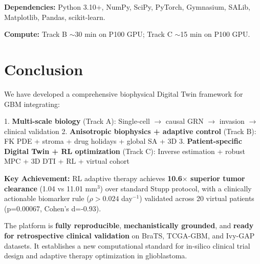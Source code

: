 \documentclass[11pt, twocolumn]{article}
\begin{document}
\textbf{Dependencies:} Python 3.10+, NumPy, SciPy, PyTorch, Gymnasium, SALib, Matplotlib, Pandas, scikit-learn.

\textbf{Compute:} Track B $\sim$30 min on P100 GPU; Track C $\sim$15 min on P100 GPU.

\section{Conclusion}

We have developed a comprehensive biophysical Digital Twin framework for GBM integrating:

1. \textbf{Multi-scale biology} (Track A): Single-cell $\to$ causal GRN $\to$ invasion $\to$ clinical validation
2. \textbf{Anisotropic biophysics + adaptive control} (Track B): FK PDE + stroma + drug holidays + global SA + 3D
3. \textbf{Patient-specific Digital Twin + RL optimization} (Track C): Inverse estimation + robust MPC + 3D DTI + RL + virtual cohort

\textbf{Key Achievement:} RL adaptive therapy achieves \textbf{10.6$\times$ superior tumor clearance} (1.04 vs 11.01 mm$^3$) over standard Stupp protocol, with a clinically actionable biomarker rule ($\rho > 0.024$ day$^{-1}$) validated across 20 virtual patients (p=0.00067, Cohen's d=-0.93).

The platform is \textbf{fully reproducible}, \textbf{mechanistically grounded}, and \textbf{ready for retrospective clinical validation} on BraTS, TCGA-GBM, and Ivy-GAP datasets. It establishes a new computational standard for in-silico clinical trial design and adaptive therapy optimization in glioblastoma.



\end{document}
